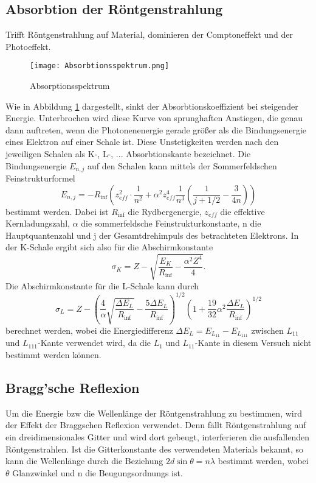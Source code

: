 \subsection{Absorbtion der Röntgenstrahlung}
    Trifft Röntgenstrahlung auf Material, dominieren der Comptoneffekt und der Photoeffekt.
    \begin{figure}
        \centering
        \texttt{[image: Absorbtionsspektrum.png]}
        \caption{Absorptionsspektrum}
        \label{fig:rechtschreifehler}
      \end{figure}
    Wie in Abbildung \ref{fig:rechtschreifehler} dargestellt, sinkt der Absorbtionskoeffizient bei steigender Energie.
    Unterbrochen wird diese Kurve von sprunghaften Anstiegen, die genau dann auftreten, wenn 
    die Photonenenergie gerade größer als die Bindungsenergie eines Elektron auf einer Schale ist.
    Diese Unstetigkeiten werden nach den jeweiligen Schalen als K-, L-, ... Absorbtionskante
    bezeichnet. Die Bindungsenergie $E_{n,j}$ auf den Schalen kann mittels der 
    Sommerfeldschen Feinstrukturformel
    \begin{equation}
        E_{n, j}=-R_{\inf}(z_{eff}^2 \cdot \dfrac{1}{n^2} + \alpha^2z_{eff}^4 \dfrac{1}{n^3}
        (\dfrac{1}{j+1/2}-\dfrac{3}{4n}))
    \end{equation}
    bestimmt werden. Dabei ist $R_{\inf}$ die Rydbergenergie, $z_{eff}$ die effektive
    Kernladungszahl, $\alpha$ die sommerfeldsche Feinstrukturkonstante, n die Hauptquantenzahl
    und j der Gesamtdrehimpuls des betrachteten Elektrons. In der K-Schale ergibt sich also
    für die Abschirmkonstante 
    \begin{equation}
        \sigma_K = Z - \sqrt{\dfrac{E_K}{R_{\inf}}-\dfrac{\alpha^2 Z^4}{4}}.
        \label{eqn:sigma}
    \end{equation}
    Die Abschirmkonstante für die L-Schale kann durch 
    \begin{equation}
        \sigma_L=Z-(\dfrac{4}{\alpha} \sqrt{\dfrac{\Delta E_L}{R_{\inf}}}-\dfrac{5 \Delta E_L}
        {R_{\inf}})^{1/2} (1+\dfrac{19}{32}\alpha^2 \dfrac{\Delta E_L}{R_{\inf}})^{1/2}
    \end{equation}
    berechnet werden, wobei die Energiedifferenz $\Delta E_L = E_{L_{11}} - E_{L_{111}}$ zwischen 
    $L_{11}$ und $L_{111}$-Kante verwendet wird, da die $L_1$ und $L_{11}$-Kante in diesem
    Versuch nicht bestimmt werden können.

\subsection{Bragg'sche Reflexion}
    Um die Energie bzw die Wellenlänge der Röntgenstrahlung zu bestimmen, wird der Effekt der Braggschen 
    Reflexion verwendet. Denn fällt Röntgenstrahlung auf ein dreidimensionales Gitter
    und wird dort gebeugt, interferieren die ausfallenden Röntgenstrahlen. Ist die 
    Gitterkonstante des verwendeten Materials bekannt, so kann die Wellenlänge durch
    die Beziehung $2 d \sin{\theta}=n \lambda$ bestimmt werden, wobei $\theta$ Glanzwinkel
    und n die Beugungsordnungs ist.